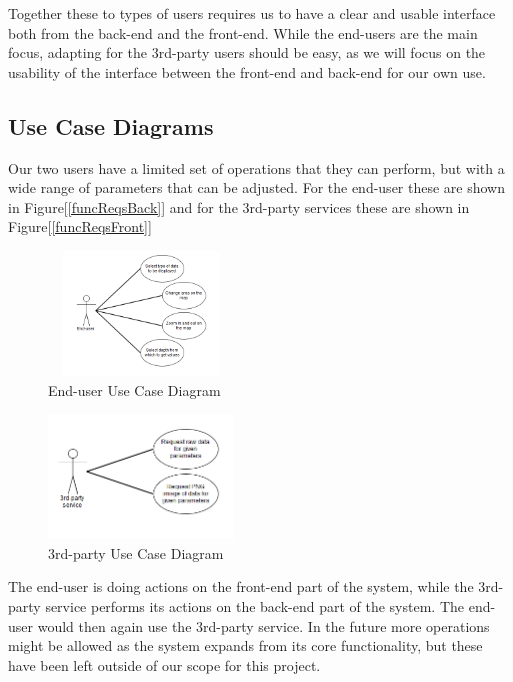 \documentclass[11pt,a4paper,titlepage,oneside]{report}
\begin{document}
  Together these to types of users requires us to have a clear and usable interface both from the back-end and the front-end. While the end-users are the main focus, adapting for the 3rd-party users should be easy, as we will focus on the usability of the interface between the front-end and back-end for our own use.

  \subsection{Use Case Diagrams}
  Our two users have a limited set of operations that they can perform, but with a wide range of parameters that can be adjusted. For the end-user these are shown in Figure[\ref{funcReqsBack}] and for the 3rd-party services these are shown in Figure[\ref{funcReqsFront}]
  \begin{figure}[h]
	\begin{center}
	\includegraphics[height=125px,width=186px]{img/useCase_EndUser.png}
	\caption{End-user Use Case Diagram}
	\label{fig:endUserUseDiagram}
	\small
	\end{center}
  \end{figure}

  \begin{figure}[h]
	\begin{center}
	\includegraphics[height=125px,width=186px]{img/useCase_3rdParty.png}
	\caption{3rd-party Use Case Diagram}
	\label{fig:3rdPartyUseDiagram}
	\small
	\end{center}
  \end{figure}

    The end-user is doing actions on the front-end part of the system, while the 3rd-party service performs its actions on the back-end part of the system. The end-user would then again use the 3rd-party service. In the future more operations might be allowed as the system expands from its core functionality, but these have been left outside of our scope for this project.
\end{document}
